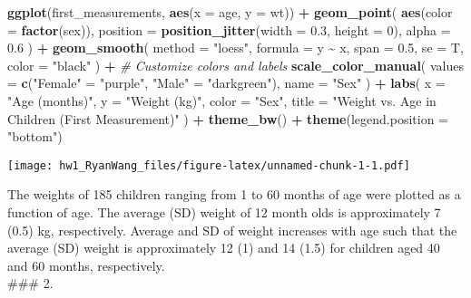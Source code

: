 \documentclass[
]{article}
\newenvironment{Shaded}{\begin{snugshade}}{\end{snugshade}}
\newcommand{\AttributeTok}[1]{\textcolor[rgb]{0.13,0.29,0.53}{#1}}
\newcommand{\CommentTok}[1]{\textcolor[rgb]{0.56,0.35,0.01}{\textit{#1}}}
\newcommand{\DecValTok}[1]{\textcolor[rgb]{0.00,0.00,0.81}{#1}}
\newcommand{\FloatTok}[1]{\textcolor[rgb]{0.00,0.00,0.81}{#1}}
\newcommand{\FunctionTok}[1]{\textcolor[rgb]{0.13,0.29,0.53}{\textbf{#1}}}
\newcommand{\NormalTok}[1]{#1}
\newcommand{\OtherTok}[1]{\textcolor[rgb]{0.56,0.35,0.01}{#1}}
\newcommand{\SpecialCharTok}[1]{\textcolor[rgb]{0.81,0.36,0.00}{\textbf{#1}}}
\newcommand{\StringTok}[1]{\textcolor[rgb]{0.31,0.60,0.02}{#1}}
\begin{document}
\begin{Shaded}
\begin{Highlighting}[]
\FunctionTok{ggplot}\NormalTok{(first\_measurements, }\FunctionTok{aes}\NormalTok{(}\AttributeTok{x =}\NormalTok{ age, }\AttributeTok{y =}\NormalTok{ wt)) }\SpecialCharTok{+}
  \FunctionTok{geom\_point}\NormalTok{(}
    \FunctionTok{aes}\NormalTok{(}\AttributeTok{color =} \FunctionTok{factor}\NormalTok{(sex)),}
    \AttributeTok{position =} \FunctionTok{position\_jitter}\NormalTok{(}\AttributeTok{width =} \FloatTok{0.3}\NormalTok{, }\AttributeTok{height =} \DecValTok{0}\NormalTok{),}
    \AttributeTok{alpha =} \FloatTok{0.6}
\NormalTok{  ) }\SpecialCharTok{+}
  \FunctionTok{geom\_smooth}\NormalTok{(}
    \AttributeTok{method =} \StringTok{"loess"}\NormalTok{,}
    \AttributeTok{formula =}\NormalTok{ y }\SpecialCharTok{\textasciitilde{}}\NormalTok{ x,}
    \AttributeTok{span =} \FloatTok{0.5}\NormalTok{,}
    \AttributeTok{se =}\NormalTok{ T,  }
    \AttributeTok{color =} \StringTok{"black"} 
\NormalTok{  ) }\SpecialCharTok{+}
  \CommentTok{\# Customize colors and labels}
  \FunctionTok{scale\_color\_manual}\NormalTok{(}
    \AttributeTok{values =} \FunctionTok{c}\NormalTok{(}\StringTok{"Female"} \OtherTok{=} \StringTok{"purple"}\NormalTok{, }\StringTok{"Male"} \OtherTok{=} \StringTok{"darkgreen"}\NormalTok{),  }
    \AttributeTok{name =} \StringTok{"Sex"}
\NormalTok{  ) }\SpecialCharTok{+}
  \FunctionTok{labs}\NormalTok{(}
    \AttributeTok{x =} \StringTok{"Age (months)"}\NormalTok{,}
    \AttributeTok{y =} \StringTok{"Weight (kg)"}\NormalTok{,}
    \AttributeTok{color =} \StringTok{"Sex"}\NormalTok{,}
    \AttributeTok{title =} \StringTok{"Weight vs. Age in Children (First Measurement)"}
\NormalTok{  ) }\SpecialCharTok{+}
  \FunctionTok{theme\_bw}\NormalTok{() }\SpecialCharTok{+}
  \FunctionTok{theme}\NormalTok{(}\AttributeTok{legend.position =} \StringTok{"bottom"}\NormalTok{)  }
\end{Highlighting}
\end{Shaded}

\texttt{[image: hw1\_RyanWang\_files/figure-latex/unnamed-chunk-1-1.pdf]}

The weights of 185 children ranging from 1 to 60 months of age were
plotted as a function of age. The average (SD) weight of 12 month olds
is approximately 7 (0.5) kg, respectively. Average and SD of weight
increases with age such that the average (SD) weight is approximately 12
(1) and 14 (1.5) for children aged 40 and 60 months, respectively.\\
\#\#\# 2.
\end{document}
